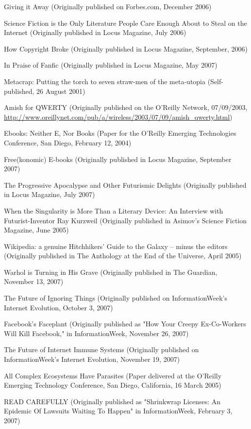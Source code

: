 Giving it Away (Originally published on Forbes.com, December 2006)

Science Fiction is the Only Literature People Care Enough About to
Steal on the Internet (Originally published in Locus Magazine, July
2006)

How Copyright Broke (Originally published in Locus Magazine,
September, 2006)

In Praise of Fanfic (Originally published in Locus Magazine, May
2007)

Metacrap: Putting the torch to seven straw-men of the meta-utopia
(Self-published, 26 August 2001)

Amish for QWERTY (Originally published on the O'Reilly Network,
07/09/2003,
\href{http://www.oreillynet.com/pub/a/wireless/2003/07/09/amish_qwerty.html}{http://www.oreillynet.com/pub/a/wireless/2003/07/09/amish\_qwerty.html})

Ebooks: Neither E, Nor Books (Paper for the O'Reilly Emerging
Technologies Conference, San Diego, February 12, 2004)

Free(konomic) E-books (Originally published in Locus Magazine,
September 2007)

The Progressive Apocalypse and Other Futurismic Delights
(Originally published in Locus Magazine, July 2007)

When the Singularity is More Than a Literary Device: An Interview
with Futurist-Inventor Ray Kurzweil (Originally published in
Asimov's Science Fiction Magazine, June 2005)

Wikipedia: a genuine Hitchhikers' Guide to the Galaxy -- minus the
editors (Originally published in The Anthology at the End of the
Universe, April 2005)

Warhol is Turning in His Grave (Originally published in The
Guardian, November 13, 2007)

The Future of Ignoring Things (Originally published on
InformationWeek's Internet Evolution, October 3, 2007)

Facebook's Faceplant (Originally published as "How Your Creepy
Ex-Co-Workers Will Kill Facebook," in InformationWeek, November 26,
2007)

The Future of Internet Immune Systems (Originally published on
InformationWeek's Internet Evolution, November 19, 2007)

All Complex Ecosystems Have Parasites (Paper delivered at the
O'Reilly Emerging Technology Conference, San Diego, California, 16
March 2005)

READ CAREFULLY (Originally published as "Shrinkwrap Licenses: An
Epidemic Of Lawsuits Waiting To Happen" in InformationWeek,
February 3, 2007)

